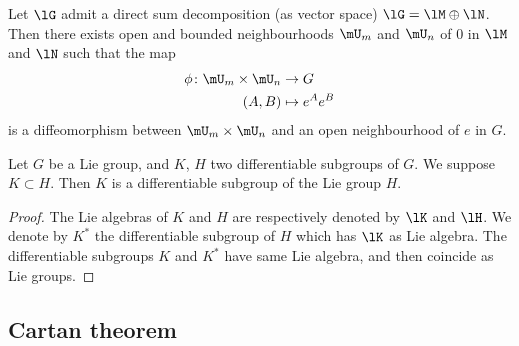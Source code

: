 \begin{lemma}  \label{LEMooEBQUooKXkCda}
	Let $\lG$ admit a direct sum decomposition (as vector space) $\lG=\lM\oplus\lN$. Then there exists open and bounded neighbourhoods $\mU_m$ and $\mU_n$ of $0$ in $\lM$ and $\lN$ such that the map
	\begin{equation}
		\begin{aligned}
			\phi \colon \mU_m\times\mU_n & \to G          \\
			(A,B)                        & \mapsto e^Ae^B
		\end{aligned}
	\end{equation}
	is a diffeomorphism between $\mU_m\times\mU_n$ and an open neighbourhood of $e$ in $G$.
\end{lemma}


\begin{corollary}
	Let $G$ be a Lie group, and $K$, $H$ two differentiable subgroups of $G$. We suppose $K\subset H$. Then $K$ is a differentiable subgroup of the Lie group $H$.
\end{corollary}

\begin{proof}
	The Lie algebras of $K$ and $H$ are respectively denoted by $\lK$ and $\lH$. We denote by $K^*$ the differentiable subgroup of $H$ which has $\lK$ as Lie algebra. The differentiable subgroups $K$ and $K^*$ have same Lie algebra, and then coincide as Lie groups.
\end{proof}

\subsection{Cartan theorem}

